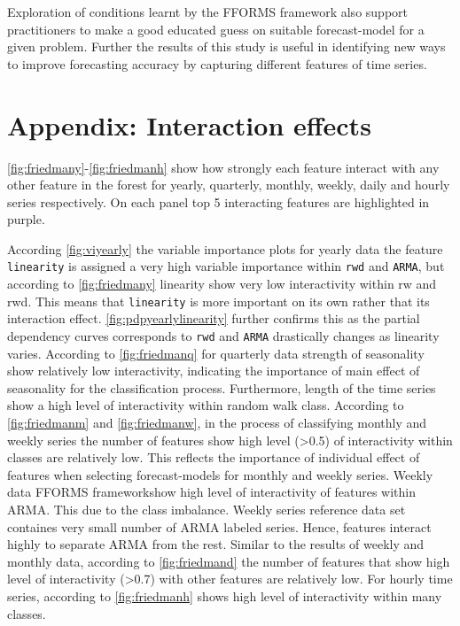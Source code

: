 \documentclass[11pt,a4paper,]{article}
\begin{document}
Exploration of conditions learnt by the FFORMS framework also support practitioners to make a good educated guess on suitable forecast-model for a given problem. Further the results of this study is useful in identifying new ways to improve forecasting accuracy by capturing different features of time series.

\hypertarget{appendix-interaction-effects}{%
\section*{Appendix: Interaction effects}\label{appendix-interaction-effects}}

\autoref{fig:friedmany}-\autoref{fig:friedmanh} show how strongly each feature interact with any other feature in the forest for yearly, quarterly, monthly, weekly, daily and hourly series respectively. On each panel top 5 interacting features are highlighted in purple.

According \autoref{fig:viyearly} the variable importance plots for yearly data the feature \texttt{linearity} is assigned a very high variable importance within \texttt{rwd} and \texttt{ARMA}, but according to \autoref{fig:friedmany} linearity show very low interactivity within rw and rwd. This means that \texttt{linearity} is more important on its own rather that its interaction effect. \autoref{fig:pdpyearlylinearity} further confirms this as the partial dependency curves corresponds to \texttt{rwd} and \texttt{ARMA} drastically changes as linearity varies. According to \autoref{fig:friedmanq} for quarterly data strength of seasonality show relatively low interactivity, indicating the importance of main effect of seasonality for the classification process. Furthermore, length of the time series show a high level of interactivity within random walk class. According to \autoref{fig:friedmanm} and \autoref{fig:friedmanw}, in the process of classifying monthly and weekly series the number of features show high level (\textgreater{}0.5) of interactivity within classes are relatively low. This reflects the importance of individual effect of features when selecting forecast-models for monthly and weekly series. Weekly data FFORMS frameworkshow high level of interactivity of features within ARMA. This due to the class imbalance. Weekly series reference data set containes very small number of ARMA labeled series. Hence, features interact highly to separate ARMA from the rest. Similar to the results of weekly and monthly data, according to \autoref{fig:friedmand} the number of features that show high level of interactivity (\textgreater{}0.7) with other features are relatively low. For hourly time series, according to \autoref{fig:friedmanh} shows high level of interactivity within many classes.
\end{document}
